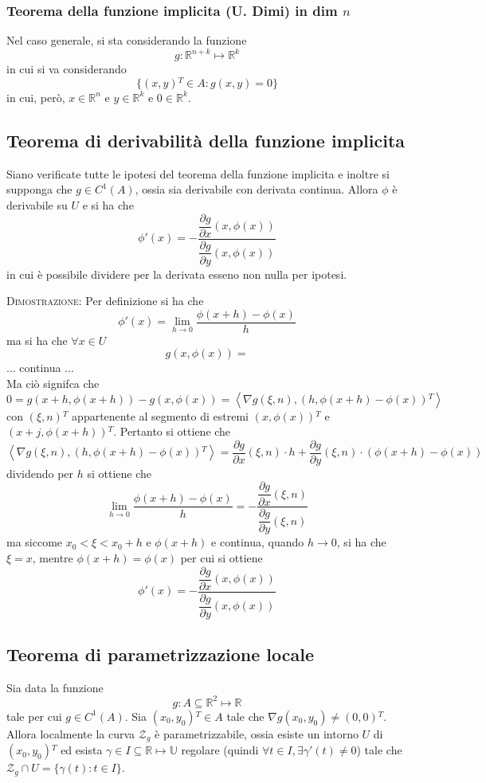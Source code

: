 \documentclass[a4paper]{extarticle}
\begin{document}
\vspace{1em}
\subsubsection{Teorema della funzione implicita (U. Dimi) in dim $n$}
Nel caso generale, si sta considerando la funzione
\[g : \mathbb{R}^{n+k} \longmapsto \mathbb{R}^k\]
in cui si va considerando
\[\{(x,y){^T} \in A : g(x,y) = 0\}\]
in cui, però, $x \in \mathbb{R}^n$ e $y \in \mathbb{R}^k$ e $0 \in \mathbb{R}^k$.

\vspace{1em}
\subsection{Teorema di derivabilità della funzione implicita}
Siano verificate tutte le ipotesi del teorema della funzione implicita e inoltre si supponga che $g \in C^1(A)$, ossia sia derivabile con derivata continua. Allora $\phi$ è derivabile su $U$ e si ha che
\[\phi'(x) = - \dfrac{\dfrac{\partial g}{\partial x} (x,\phi(x))}{\dfrac{\partial g}{\partial y}(x,\phi(x))}\]
in cui è possibile dividere per la derivata esseno non nulla per ipotesi.

\vspace{2em}
\noindent
\normalfont \normalsize
\textsc{Dimostrazione}: Per definizione si ha che
\[\phi'(x) = \lim_{h \to 0} \dfrac{\phi(x+h) - \phi(x)}{h}\]
ma si ha che $\forall x \in U$
\[g(x,\phi(x)) = \]
... continua ...\\
Ma ciò signifca che
\[0 = g(x+h,\phi(x+h)) - g(x,\phi(x)) = \left<\nabla g(\xi,n), \left(h,\phi(x+h)-\phi(x)\right){^T} \right>\]
con $(\xi,n){^T}$ appartenente al segmento di estremi $(x,\phi(x)){^T}$ e $(x+j,\phi(x+h)){^T}$. Pertanto si ottiene che
\[\left<\nabla g(\xi,n), \left(h,\phi(x+h)-\phi(x)\right){^T} \right> = \dfrac{\partial g}{\partial x}(\xi,n) \cdot h + \dfrac{\partial g}{\partial y} (\xi,n) \cdot (\phi(x+h) - \phi(x))\]
dividendo per $h$ si ottiene che
\[\lim_{h \to 0} \dfrac{\phi(x+h) - \phi(x)}{h} = - \dfrac{\dfrac{\partial g}{\partial x} (\xi,n)}{\dfrac{\partial g}{\partial y}(\xi,n)}\]
ma siccome $x_0 < \xi < x_0+h$ e $\phi(x+h)$ e continua, quando $h \to 0$, si ha che $\xi = x$, mentre $\phi(x+h)=\phi(x)$
per cui si ottiene
\[\phi'(x) = - \dfrac{\dfrac{\partial g}{\partial x} (x,\phi(x))}{\dfrac{\partial g}{\partial y}(x,\phi(x))}\]

\vspace{1em}
\subsection{Teorema di parametrizzazione locale}
Sia data la funzione
\[g : A \subseteq \mathbb{R}^2 \longmapsto \mathbb{R}\]
tale per cui $g \in C^1(A)$. Sia $(x_0,y_0){^T} \in A$ tale che $\nabla g(x_0,y_0) \neq (0,0){^T}$.\\
Allora localmente la curva $\mathcal{Z}_g$ è parametrizzabile, ossia esiste un intorno $U$ di $(x_0,y_0){^T}$ ed esista $\gamma \in I \subseteq \mathbb{R} \longmapsto \mathbb{U}$ regolare (quindi $\forall t \in I, \exists \gamma'(t) \neq 0$) tale che $\mathcal{Z}_g \cap U = \{\gamma(t) : t \in I\}$.
\end{document}
